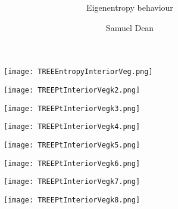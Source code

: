 \documentclass[pdf]{beamer}
\title{\textbf{}}
\subtitle{Eigenentropy behaviour}
\author{Samuel Dean}
\begin{document}
\begin{frame}
\titlepage
\end{frame}

\begin{frame}
\begin{figure}[!h]
\centering
\texttt{[image: TREEEntropyInteriorVeg.png]}
\end{figure}
\end{frame}

\begin{frame}
\begin{figure}[!h]
\centering
\texttt{[image: TREEPtInteriorVegk2.png]}
\end{figure}
\end{frame}

\begin{frame}
\begin{figure}[!h]
\centering
\texttt{[image: TREEPtInteriorVegk3.png]}
\end{figure}
\end{frame}

\begin{frame}
\begin{figure}[!h]
\centering
\texttt{[image: TREEPtInteriorVegk4.png]}
\end{figure}
\end{frame}

\begin{frame}
\begin{figure}[!h]
\centering
\texttt{[image: TREEPtInteriorVegk5.png]}
\end{figure}
\end{frame}

\begin{frame}
\begin{figure}[!h]
\centering
\texttt{[image: TREEPtInteriorVegk6.png]}
\end{figure}
\end{frame}

\begin{frame}
\begin{figure}[!h]
\centering
\texttt{[image: TREEPtInteriorVegk7.png]}
\end{figure}
\end{frame}

\begin{frame}
\begin{figure}[!h]
\centering
\texttt{[image: TREEPtInteriorVegk8.png]}
\end{figure}
\end{frame}
\end{document}
